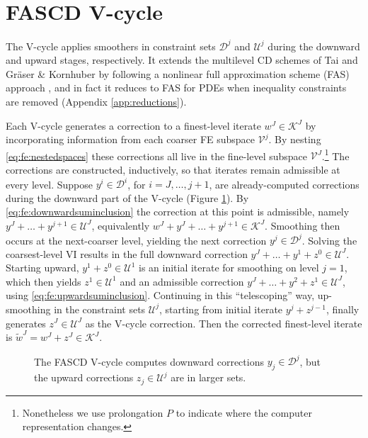 \documentclass[letterpaper,final,12pt,reqno]{amsart}
\theoremstyle{cstyle}
\theoremstyle{cstyle*}
\theoremstyle{dstyle}
\numberwithin{equation}{section}
\numberwithin{figure}{section}
\numberwithin{table}{section}
\numberwithin{theorem}{section}
\begin{document}
\section{FASCD V-cycle} \label{sec:vcycle}

The V-cycle applies smoothers in constraint sets $\mathcal{D}^j$ and $\mathcal{U}^j$ during the downward and upward stages, respectively.  It extends the multilevel CD schemes of Tai \cite{Tai2003} and Gr\"aser \& Kornhuber \cite[Algorithm 4.7]{GraeserKornhuber2009} by following a nonlinear full approximation scheme (FAS) approach \cite{BrandtLivne2011}, and in fact it reduces to FAS for PDEs when inequality constraints are removed (Appendix \ref{app:reductions}).

Each V-cycle generates a correction to a finest-level iterate $w^J \in \mathcal{K}^J$ by incorporating information from each coarser FE subspace $\mathcal{V}^j$.  By nesting \eqref{eq:fe:nestedspaces} these corrections all live in the fine-level subspace $\mathcal{V}^J$.\footnote{Nonetheless we use prolongation $P$ to indicate where the computer representation changes.}  The corrections are constructed, inductively, so that iterates remain admissible at every level.  Suppose $y^i \in \mathcal{D}^i$, for $i=J,\dots,j+1$, are already-computed corrections during the downward part of the V-cycle (Figure \ref{fig:fascdvcycle}).  By \eqref{eq:fe:downwardsuminclusion} the correction at this point is admissible, namely $y^J + \dots + y^{j+1} \in \mathcal{U}^J$, equivalently $w^J + y^J + \dots + y^{j+1} \in \mathcal{K}^J$.  Smoothing then occurs at the next-coarser level, yielding the next correction $y^j \in \mathcal{D}^j$.  Solving the coarsest-level VI results in the full downward correction $y^J + \dots + y^1 + z^0 \in \mathcal{U}^J$.  Starting upward, $y^1 + z^0 \in \mathcal{U}^1$ is an initial iterate for smoothing on level $j=1$, which then yields $z^1 \in \mathcal{U}^1$ and an admissible correction $y^J + \dots + y^2 + z^1 \in \mathcal{U}^J$, using \eqref{eq:fe:upwardsuminclusion}.  Continuing in this ``telescoping'' way, up-smoothing in the constraint sets $\mathcal{U}^j$, starting from initial iterate $y^j+z^{j-1}$, finally generates $z^J\in \mathcal{U}^J$ as the V-cycle correction.  Then the corrected finest-level iterate is $\tilde{w}^J = w^J + z^J \in \mathcal{K}^J$.

\begin{figure}[ht]
\begin{center}

\end{center}
\caption{The FASCD V-cycle computes downward corrections $y_j \in \mathcal{D}^j$, but the upward corrections $z_j\in\mathcal{U}^j$ are in larger sets.}
\label{fig:fascdvcycle}
\end{figure}
\end{document}
